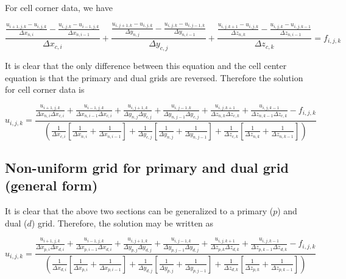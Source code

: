 \documentclass[11pt]{article}
\begin{document}
For cell corner data, we have

\begin{equation}
	\frac{\frac{u_{i+1,j,k}-u_{i,j,k}}{\Delta x_{n,i}} - \frac{u_{i,j,k}-u_{i-1,j,k}}{\Delta x_{n,i-1}}}{\Delta x_{c,i}} + 
	\frac{\frac{u_{i,j+1,k}-u_{i,j,k}}{\Delta y_{n,j}} - \frac{u_{i,j,k}-u_{i,j-1,k}}{\Delta y_{n,i-1}}}{\Delta y_{c,j}} +
	\frac{\frac{u_{i,j,k+1}-u_{i,j,k}}{\Delta z_{n,k}} - \frac{u_{i,j,k}-u_{i,j,k-1}}{\Delta z_{n,i-1}}}{\Delta z_{c,k}} = f_{i,j,k}
\end{equation}

It is clear that the only difference between this equation and the cell center equation is that the primary and dual grids are reversed. Therefore the solution for cell corner data is

\begin{equation}
	u_{i,j,k} = 
	\frac{ 
	\frac{u_{i+1,j,k}}{\Delta x_{n,i} \Delta x_{c,i}} + \frac{u_{i-1,j,k}}{\Delta x_{n,i-1} \Delta x_{c,i}} + 
	\frac{u_{i,j+1,k}}{\Delta y_{n,j} \Delta y_{c,j}} + \frac{u_{i,j-1,k}}{\Delta y_{n,j-1} \Delta y_{c,j}} +
	\frac{u_{i,j,k+1}}{\Delta z_{n,k} \Delta z_{c,k}} + \frac{u_{i,j,k-1}}{\Delta z_{n,k-1} \Delta z_{c,k}}
	- f_{i,j,k} }{
	\left( 
	\frac{ 1 }{ \Delta x_{c,i} }
	\left[
	\frac{ 1 }{ \Delta x_{n,i} } +
	\frac{ 1 }{ \Delta x_{n,i-1} }
	\right] +
	\frac{ 1 }{ \Delta y_{c,j} }
	\left[
	\frac{ 1 }{ \Delta y_{n,j} } +
	\frac{ 1 }{ \Delta y_{n,j-1} }
	\right] +
	\frac{ 1 }{ \Delta z_{c,k} }
	\left[
	\frac{ 1 }{ \Delta z_{n,k} } +
	\frac{ 1 }{ \Delta z_{n,k-1} }
	\right]
	\right)
	}
\end{equation}


\subsection{Non-uniform grid for primary and dual grid (general form)}
It is clear that the above two sections can be generalized to a primary ($p$) and dual ($d$) grid. Therefore, the solution may be written as


\begin{equation}
	u_{i,j,k} = 
	\frac{ 
	\frac{u_{i+1,j,k}}{\Delta x_{p,i} \Delta x_{d,i}} + \frac{u_{i-1,j,k}}{\Delta x_{p,i-1} \Delta x_{d,i}} + 
	\frac{u_{i,j+1,k}}{\Delta y_{p,j} \Delta y_{d,j}} + \frac{u_{i,j-1,k}}{\Delta y_{p,j-1} \Delta y_{d,j}} +
	\frac{u_{i,j,k+1}}{\Delta z_{p,k} \Delta z_{d,k}} + \frac{u_{i,j,k-1}}{\Delta z_{p,k-1} \Delta z_{d,k}}
	- f_{i,j,k} }{
	\left( 
	\frac{ 1 }{ \Delta x_{d,i} }
	\left[
	\frac{ 1 }{ \Delta x_{p,i} } +
	\frac{ 1 }{ \Delta x_{p,i-1} }
	\right] +
	\frac{ 1 }{ \Delta y_{d,j} }
	\left[
	\frac{ 1 }{ \Delta y_{p,j} } +
	\frac{ 1 }{ \Delta y_{p,j-1} }
	\right] +
	\frac{ 1 }{ \Delta z_{d,k} }
	\left[
	\frac{ 1 }{ \Delta z_{p,k} } +
	\frac{ 1 }{ \Delta z_{p,k-1} }
	\right]
	\right)
	}
\end{equation}
\end{document}
